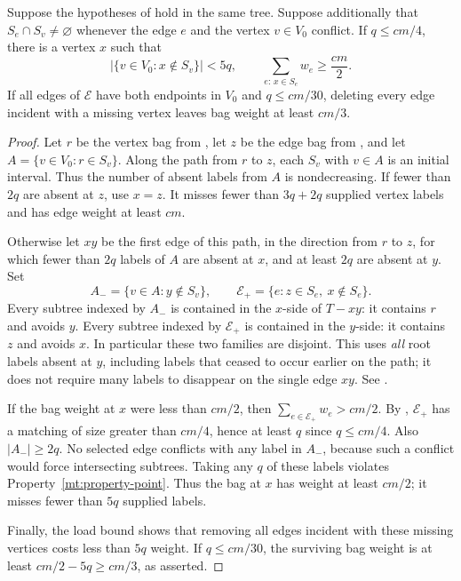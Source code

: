 \begin{proposition}\label{mt:common-bag}
Suppose the hypotheses of 
hold in the same tree.  Suppose additionally that
\(S_e\cap S_v\ne\varnothing\) whenever the edge \(e\) and the
vertex \(v\in V_0\) conflict.  If
\(q\le cm/4\), there is a vertex \(x\) such that
\begin{equation}\label{mt:common-counts}
 |\{v\in V_0:x\notin S_v\}|<5q,
 \qquad \sum_{e:\,x\in S_e}w_e\ge\frac{cm}{2}.
\end{equation}
If all edges of \(\mathcal E\) have both endpoints in \(V_0\) and
\(q\le cm/30\), deleting every edge incident with a missing vertex
leaves bag weight at least \(cm/3\).
\end{proposition}
\begin{proof}
Let \(r\) be the vertex bag from , let
\(z\) be the edge bag from , and let
\(A=\{v\in V_0:r\in S_v\}\).  Along the path from \(r\) to
\(z\), each \(S_v\) with \(v\in A\) is an initial interval.
Thus the number of absent labels from \(A\) is nondecreasing.
If fewer than \(2q\) are absent at \(z\), use \(x=z\).
It misses fewer than \(3q+2q\) supplied vertex labels and has
edge weight at least \(cm\).

Otherwise let \(xy\) be the first edge of this path, in the
direction from \(r\) to \(z\), for which fewer than \(2q\)
labels of \(A\) are absent at \(x\), and at least \(2q\) are
absent at \(y\).  Set
\[
 A_- =\{v\in A:y\notin S_v\},\qquad
 \mathcal E_+=\{e:z\in S_e,\ x\notin S_e\}.
\]
Every subtree indexed by \(A_-\) is contained in the \(x\)-side
of \(T-xy\): it contains \(r\) and avoids \(y\).  Every subtree
indexed by \(\mathcal E_+\) is contained in the \(y\)-side: it
contains \(z\) and avoids \(x\).  In particular these two
families are disjoint.  This uses \emph{all} root labels absent at
\(y\), including labels that ceased to occur earlier on the path;
it does not require many labels to disappear on the single edge
\(xy\).  See .

If the bag weight at \(x\) were less than \(cm/2\), then
\(\sum_{e\in\mathcal E_+}w_e>cm/2\).
By , \(\mathcal E_+\) has a matching of
size greater than \(cm/4\), hence at least \(q\) since
\(q\le cm/4\).  Also \(|A_-|\ge2q\).  No selected edge conflicts
with any label in \(A_-\), because such a conflict would force
intersecting subtrees.  Taking any \(q\) of these labels violates
Property~\ref{mt:property-point}.  Thus the bag at \(x\) has weight
at least \(cm/2\); it misses fewer than \(5q\) supplied labels.

Finally, the load bound shows that removing all edges incident
with these missing vertices costs less than \(5q\) weight.
If \(q\le cm/30\), the surviving bag weight is at least
\(cm/2-5q\ge cm/3\), as asserted.
\end{proof}

